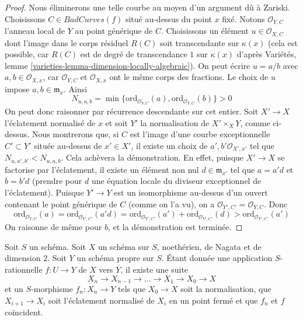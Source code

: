 \begin{proof}
\medskip\noindent Nous éliminerons une telle courbe au moyen d'un argument dû à Zariski. Choisissons $C \in BadCurves(f)$ situé au-dessus du point $x$ fixé. Notons $\mathcal{O}_{Y, C}$ l'anneau local de $Y$ au point générique de $C$. Choisissons un élément $u \in \mathcal{O}_{X, C}$ dont l'image dans le corps résiduel $R(C)$ soit transcendante sur $\kappa(x)$ (cela est possible, car $R(C)$ est de degré de transcendance $1$ sur $\kappa(x)$ d'après Variétés, lemme \ref{varieties-lemma-dimension-locally-algebraic}). On peut écrire $u = a/b$ avec $a, b \in \mathcal{O}_{X, x}$, car $\mathcal{O}_{Y, C}$ et $\mathcal{O}_{X, x}$ ont le même corps des fractions. Le choix de $u$ impose $a, b \in \mathfrak m_x$. Ainsi $$
N_{u, a, b} = \min
\{\text{ord}_{\mathcal{O}_{Y, C}}(a), \text{ord}_{\mathcal{O}_{Y, C}}(b)\} > 0
$$ On peut donc raisonner par récurrence descendante sur cet entier. Soit $X' \to X$ l'éclatement normalisé de $x$ et soit $Y'$ la normalisation de $X' \times_X Y$, comme ci-dessus. Nous montrerons que, si $C$ est l'image d'une courbe exceptionnelle $C' \subset Y'$ située au-dessus de $x' \in X'$, il existe un choix de $a', b' \mathcal{O}_{X', x'}$ tel que $N_{u, a', b'} < N_{u, a, b}$. Cela achèvera la démonstration. En effet, puisque $X' \to X$ se factorise par l'éclatement, il existe un élément non nul $d \in \mathfrak m_{x'}$ tel que $a = a' d$ et $b = b' d$ (prendre pour $d$ une équation locale du diviseur exceptionnel de l'éclatement). Puisque $Y' \to Y$ est un isomorphisme au-dessus d'un ouvert contenant le point générique de $C$ (comme on l'a vu), on a $\mathcal{O}_{Y', C'} = \mathcal{O}_{Y, C}$. Donc $$
\text{ord}_{\mathcal{O}_{Y, C}}(a) =
\text{ord}_{\mathcal{O}_{Y', C'}}(a' d) =
\text{ord}_{\mathcal{O}_{Y', C'}}(a') +
\text{ord}_{\mathcal{O}_{Y', C'}}(d) >
\text{ord}_{\mathcal{O}_{Y', C'}}(a')
$$ On raisonne de même pour $b$, et la démonstration est terminée. \end{proof}

\begin{lemma} \label{lemma-extend-rational-map-normalized-blowing-up} Soit $S$ un schéma. Soit $X$ un schéma sur $S$, noethérien, de Nagata et de dimension $2$. Soit $Y$ un schéma propre sur $S$. Étant donnée une application $S$-rationnelle $f : U \to Y$ de $X$ vers $Y$, il existe une suite $$
X_n \to X_{n - 1} \to \ldots \to X_1 \to X_0 \to X
$$ et un $S$-morphisme $f_n : X_n \to Y$ tels que $X_0 \to X$ soit la normalisation, que $X_{i + 1} \to X_i$ soit l'éclatement normalisé de $X_i$ en un point fermé et que $f_n$ et $f$ coïncident. \end{lemma}

